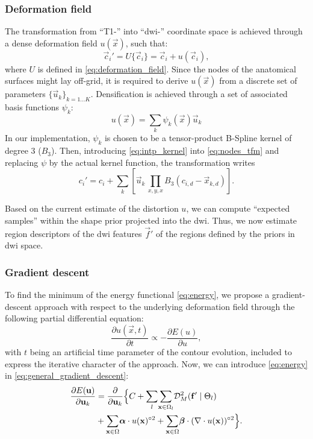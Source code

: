 \subsubsection{Deformation field}
\label{sec:deformation_field}
The transformation from ``T1-'' into ``\gls{dwi}-'' coordinate space is 
achieved through a dense deformation field $u(\vec{x})$, such that:
\begin{equation}
\vec{c}_i' = U\{\vec{c}_i\} = \vec{c}_i + u(\vec{c}_i),
\label{eq:nodes_tfm}
\end{equation}
where $U$ is defined in \eqref{eq:deformation_field}. Since the nodes of the anatomical 
surfaces might lay off-grid, it is required to derive $u(\vec{x})$ from a discrete 
set of parameters $\{\vec{u}_k\}_{k=1 \ldots K}$. Densification is achieved through 
a set of associated basis functions $\psi_k$:
%
\begin{equation}
u(\vec{x}) = \sum_k \psi_k(\vec{x}) \vec{u}_k
\label{eq:intp_kernel}
\end{equation}
%
In our implementation, $\psi_k$ is chosen to be a tensor-product B-Spline kernel
of degree 3 ($B_3$).
Then, introducing \eqref{eq:intp_kernel} into \eqref{eq:nodes_tfm} and replacing
$\psi$ by the actual kernel function, the transformation writes
%
\begin{equation}
c_i' = c_i + \sum_k \left[ \vec{u}_k \, \underset{x,y,x}{\prod} B_3(c_{i,d} - \vec{x}_{k,d}) \right].
\label{eq:transformation}
\end{equation} 

Based on the current estimate of the distortion $u$, we can compute 
``expected samples'' within the shape prior projected into the \gls{dwi}.
Thus, we now estimate region descriptors of the \gls{dwi} features 
$\vec{f}'$ of the regions defined by the priors in \gls{dwi} space.

\subsubsection{Gradient descent}
To find the minimum of the energy functional \eqref{eq:energy},
we propose a gradient-descent approach with respect to the underlying 
deformation field through the following partial differential equation:
\begin{equation}
\frac{\partial u(\vec{x},t)}{\partial t} \propto - \frac{\partial E(u)}{\partial u},
\label{eq:general_gradient_descent}
\end{equation}
with $t$ being an artificial time parameter of the contour
evolution, included to express the iterative character of the approach.
Now, we can introduce \eqref{eq:energy} in
\eqref{eq:general_gradient_descent}:
\begin{align}
\frac{\partial E(\vec{u})}{\partial \vec{u}_k} &=
\frac{ \partial }{\partial \vec{u}_k} \Big\{
C + \underset{l}{\sum}
\underset{\vec{x} \in \Omega_l}{\sum} \mdist{f'}{l} \notag\\
&+ \underset{\vec{x} \in \Omega}{\sum} \boldsymbol{\alpha} \cdot u(\vec{x})^{\circ2}
+ \underset{\vec{x} \in \Omega}{\sum} \boldsymbol{\beta} \cdot (\nabla \cdot u(\vec{x}))^{\circ2}
\Big\}.
\label{eq:gradient_descent}
\end{align}

